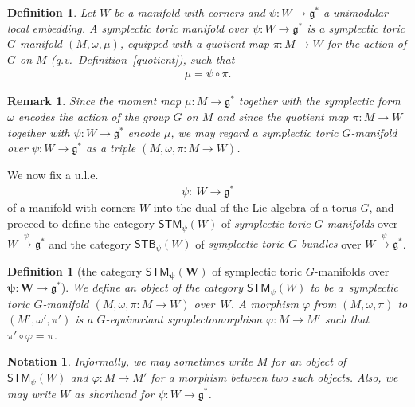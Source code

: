 \documentclass[pdftex]{sigma}
\numberwithin{equation}{section}
\newtheorem{Definition}[Lemma]{Definition}
\newtheorem{Remark}[Lemma]{Remark}
\newtheorem{Notation}[Lemma]{Notation}
\begin{document}
\begin{Definition}
  Let $W$ be a manifold with corners and $\psi\colon W\to{\mathfrak g}^*$ a unimodular
  local embedding.
  A {\em symplectic toric manifold over $\psi\colon W\to{\mathfrak g}^*$}
  is a symplectic toric $G$-manifold $(M,\omega,\mu)$,
  equipped with a quotient map $\pi\colon M\to W$
  for the action of $G$ on $M$ (q.v.\ Def\/inition~\ref{quotient}),
  such that
\begin{gather*}
\mu = \psi \circ \pi.
\end{gather*}
\end{Definition}

\begin{Remark}
  Since the moment map $\mu\colon M\to {\mathfrak g}^*$ together with the symplectic
  form $\omega$ encodes the action of the group $G$ on $M$ and since
  the quotient map $\pi\colon M\to W$ together with $\psi\colon W\to{\mathfrak g}^*$ encode
  $\mu$, we may regard a symplectic toric $G$-manifold over $\psi\colon W\to
  {\mathfrak g}^*$ as a triple $(M,\omega, \pi\colon M\to W)$.
\end{Remark}

We now f\/ix a u.l.e.\
\begin{gather*}
\psi \colon \  W \to {\mathfrak g}^*
\end{gather*}
of a manifold with corners $W$ into the dual of the Lie algebra
of a torus $G$,
and proceed to def\/ine the category ${\textsf{STM}}_\psi(W)$
of \emph{symplectic toric $G$-manifolds} over $W\stackrel{\psi}{\to} {\mathfrak g}^*$
and the category ${\textsf{STB}}_\psi(W)$
of \emph{symplectic toric $G$-bundles} over $W\stackrel{\psi}{\to} {\mathfrak g}^*$.


\begin{Definition}[the category $\mathbf{{\textsf{STM}}_\psi (W)}$ of symplectic toric
  $G$-manifolds over $\mathbf{\psi\colon W\to {\mathfrak g}^*}$] \label{def:STM}
  We
  def\/ine an \emph{object} of the category ${\textsf{STM}}_\psi(W)$ to be a~symplectic toric $G$-manifold  \mbox{$(M,\omega, \pi\colon M{\to} W)$} over~$W$.
  A \emph{morphism} $\varphi$ from $(M, \omega,  \pi)$
  to $(M', \omega', \pi') $
  is a $G$-equivariant symplectomorphism $\varphi \colon M \to M'$
  such that $\pi' \circ \varphi = \pi$.
\end{Definition}


\begin{Notation} \label{notation for STM}\sloppy
Informally, we may sometimes write  $M$ for an object of
${\textsf{STM}}_\psi (W)$ and \mbox{$\varphi \colon M \to M'$} for a
morphism between two such objects.
Also, we may write $W$ as shorthand for
\mbox{$\psi \colon W \to {\mathfrak g}^*$}.
\end{Notation}
\end{document}

